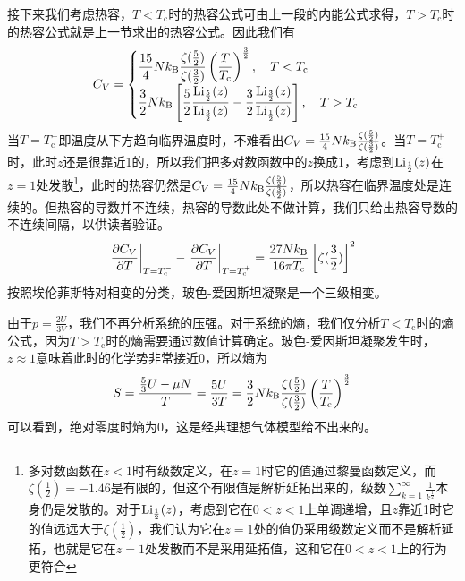 \documentclass[../../main.tex]{subfiles}
\begin{document}
接下来我们考虑热容，\(T<T_{\mathrm{c}}\)时的热容公式可由上一段的内能公式求得，\(T>T_{\mathrm{c}}\)时的热容公式就是上一节求出的热容公式。因此我们有
\begin{equation}
    C_V=\begin{cases}
        \displaystyle \frac{15}{4}Nk_{\mathrm{B}}\frac{\zeta(\frac{5}{2})}{\zeta(\frac{3}{2})}\left(\frac{T}{T_{\mathrm{c}}}\right)^{\frac{3}{2}} ,\quad T<T_{\mathrm{c}}\\
        \displaystyle \frac{3}{2}Nk_{\mathrm{B}}\left[\frac{5}{2}\frac{\mathrm{Li}_{\frac{5}{2}}(z)}{\mathrm{Li}_{\frac{3}{2}}(z)}-\frac{3}{2}\frac{\mathrm{Li}_{\frac{3}{2}}(z)}{\mathrm{Li}_{\frac{1}{2}}(z)}\right],\quad T>T_{\mathrm{c}}
    \end{cases}
\end{equation}
当\(T=T_{\mathrm{c}}^-\)即温度从下方趋向临界温度时，不难看出\(C_V=\frac{15}{4}Nk_{\mathrm{B}}\frac{\zeta(\frac{5}{2})}{\zeta(\frac{3}{2})}\)。当\(T=T_{\mathrm{c}}^+\)时，此时\(z\)还是很靠近1的，所以我们把多对数函数中的\(z\)换成1，考虑到\(\mathrm{Li}_{\frac{1}{2}}(z)\)在\(z=1\)处发散\footnote{多对数函数在\(z<1\)时有级数定义，在\(z=1\)时它的值通过黎曼函数定义，而\(\zeta(\frac{1}{2})=-1.46\)是有限的，但这个有限值是解析延拓出来的，级数\(\displaystyle \sum_{k=1}^{\infty}\frac{1}{k^{\frac{1}{2}}}\)本身仍是发散的。对于\(\mathrm{Li}_{\frac{1}{2}}(z)\)，考虑到它在\(0<z<1\)上单调递增，且\(z\)靠近1时它的值远远大于\(\zeta(\frac{1}{2})\)，我们认为它在\(z=1\)处的值仍采用级数定义而不是解析延拓，也就是它在\(z=1\)处发散而不是采用延拓值，这和它在\(0<z<1\)上的行为更符合}，此时的热容仍然是\(C_V=\frac{15}{4}Nk_{\mathrm{B}}\frac{\zeta(\frac{5}{2})}{\zeta(\frac{3}{2})}\)，所以热容在临界温度处是连续的。但热容的导数并不连续，热容的导数此处不做计算，我们只给出热容导数的不连续间隔，以供读者验证。
\begin{equation}
    \eval{\pdv{C_V}{T}}_{T=T_{\mathrm{c}}^-}-\eval{\pdv{C_V}{T}}_{T=T_{\mathrm{c}}^+}=\frac{27N\k}{16\pi T_{\mathrm{c}}}\left[\zeta(\frac{3}{2})\right]^2
\end{equation}
按照埃伦菲斯特对相变的分类，玻色-爱因斯坦凝聚是一个三级相变。

由于\(p=\frac{2U}{3V}\)，我们不再分析系统的压强。对于系统的熵，我们仅分析\(T<T_{\mathrm{c}}\)时的熵公式，因为\(T>T_{\mathrm{c}}\)时的熵需要通过数值计算确定。玻色-爱因斯坦凝聚发生时，\(z\approx1\)意味着此时的化学势非常接近0，所以熵为
\begin{equation}
    S=\frac{\frac{5}{3}U-\mu N}{T}=\frac{5U}{3T}=\frac{3}{2}Nk_{\mathrm{B}} \frac{\zeta(\frac{5}{2})}{\zeta(\frac{3}{2})}\left(\frac{T}{T_{\mathrm{c}}}\right)^{\frac{3}{2}}
\end{equation}
可以看到，绝对零度时熵为0，这是经典理想气体模型给不出来的。
\end{document}

